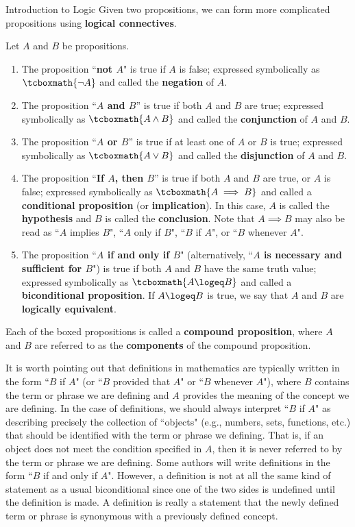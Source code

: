 \begin{section}{Introduction to Logic}
Given two propositions, we can form more complicated propositions using \textbf{logical connectives}.

\begin{definition}\label{def:logical connectives}
Let $A$ and $B$ be propositions.  
\begin{enumerate}[label=\textrm{(\alph*)}]
\item The proposition ``\textbf{not $A$}" is true if $A$ is false; expressed symbolically as 
$\tcboxmath{\neg A}$ and called the \textbf{negation} of $A$.
\item The proposition ``\textbf{$A$ and $B$}'' is true if both $A$ and $B$ are true; expressed symbolically as $\tcboxmath{A \wedge B}$ and called the \textbf{conjunction} of $A$ and $B$.
\item The proposition ``\textbf{$A$ or $B$}'' is true if at least one of $A$ or $B$ is true; expressed symbolically as $\tcboxmath{A \vee B}$ and called the \textbf{disjunction} of $A$ and $B$.
\item\label{def:conditional} The proposition ``\textbf{If $A$, then $B$}'' is true if both $A$ and $B$ are true, or $A$ is false; expressed symbolically as $\tcboxmath{A \implies B}$ and called a \textbf{conditional proposition} (or \textbf{implication}). In this case, $A$ is called the \textbf{hypothesis} and $B$ is called the \textbf{conclusion}. Note that $A \implies B$ may also be read as ``$A$ implies $B$", ``$A$ only if $B$", ``$B$ if $A$", or ``$B$ whenever $A$". 
\item\label{def:logically equivalent} The proposition ``\textbf{$A$ if and only if $B$}" (alternatively, ``\textbf{$A$ is necessary and sufficient for $B$}") is true if both $A$ and $B$ have the same truth value; expressed symbolically as $\tcboxmath{A\logeq B}$ and called a \textbf{biconditional proposition}. If $A\logeq B$ is true, we say that $A$ and $B$ are \textbf{logically equivalent}.
\end{enumerate}
Each of the boxed propositions is called a \textbf{compound proposition}, where $A$ and $B$ are referred to as the \textbf{components} of the compound proposition.
\end{definition}

It is worth pointing out that definitions in mathematics are typically written in the form ``$B$ if $A$" (or ``$B$ provided that $A$" or ``$B$ whenever $A$"), where $B$ contains the term or phrase we are defining and $A$ provides the meaning of the concept we are defining. In the case of definitions, we should always interpret ``$B$ if $A$" as describing precisely the collection of ``objects" (e.g., numbers, sets, functions, etc.) that should be identified with the term or phrase we defining.  That is, if an object does not meet the condition specified in $A$, then it is never referred to by the term or phrase we are defining. Some authors will write definitions in the form ``$B$ if and only if $A$". However, a definition is not at all the same kind of statement as a usual biconditional since one of the two sides is undefined until the definition is made. A definition is really a statement that the newly defined term or phrase is synonymous with a previously defined concept.


\end{section}
